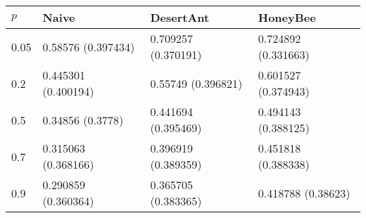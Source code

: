 \begin{tabular} {|l|l|l|l|}
\hline
$p$ & Naive & DesertAnt & HoneyBee \\
\hline
0.05 & 0.58576 (0.397434)  & 0.709257 (0.370191)  & 0.724892 (0.331663)  \\
0.2 & 0.445301 (0.400194)  & 0.55749 (0.396821)  & 0.601527 (0.374943)  \\
0.5 & 0.34856 (0.3778)  & 0.441694 (0.395469)  & 0.494143 (0.388125)  \\
0.7 & 0.315063 (0.368166)  & 0.396919 (0.389359)  & 0.451818 (0.388338)  \\
0.9 & 0.290859 (0.360364)  & 0.365705 (0.383365)  & 0.418788 (0.38623)  \\
\hline
\end{tabular}
